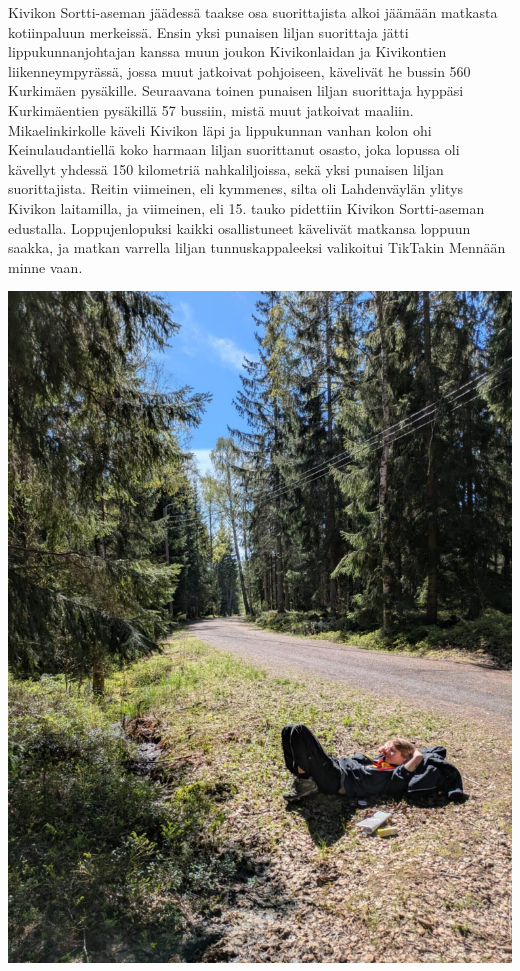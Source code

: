 \begin{multicols}{2}
Kivikon Sortti-aseman jäädessä taakse osa suorittajista alkoi jäämään matkasta kotiinpaluun merkeissä. Ensin yksi punaisen liljan suorittaja jätti lippukunnanjohtajan kanssa muun joukon Kivikonlaidan ja Kivikontien liikenneympyrässä, jossa muut jatkoivat pohjoiseen, kävelivät he bussin 560 Kurkimäen pysäkille. Seuraavana toinen punaisen liljan suorittaja hyppäsi Kurkimäentien pysäkillä 57 bussiin, mistä muut jatkoivat maaliin. Mikaelinkirkolle käveli Kivikon läpi ja lippukunnan vanhan kolon ohi Keinulaudantiellä koko harmaan liljan suorittanut osasto, joka lopussa oli kävellyt yhdessä 150 kilometriä nahkaliljoissa, sekä yksi punaisen liljan suorittajista. Reitin viimeinen, eli kymmenes, silta oli Lahdenväylän ylitys Kivikon laitamilla, ja viimeinen, eli 15. tauko pidettiin Kivikon Sortti-aseman edustalla. Loppujenlopuksi kaikki osallistuneet kävelivät matkansa loppuun saakka, ja matkan varrella liljan tunnuskappaleeksi valikoitui TikTakin Mennään minne vaan.

\begin{center}
{\centering\includegraphics[width=0.9\linewidth]{assets/liljaPain.jpeg}}
\end{center}


\end{multicols}
